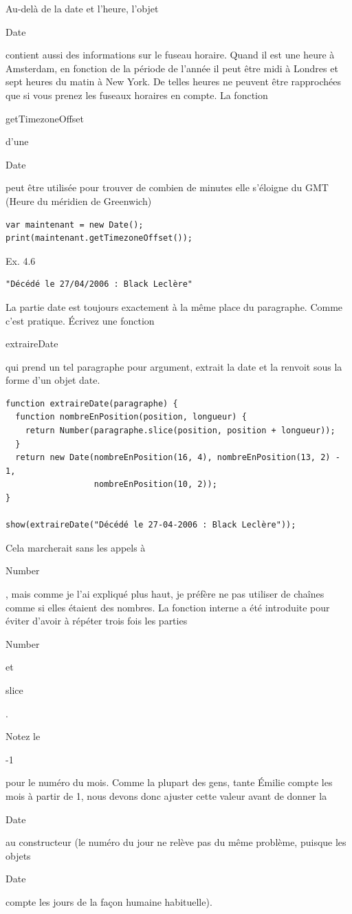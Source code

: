 \documentclass{FramateX}
\renewcommand{\texttt}[1]{\begin{sffamily}{#1}\end{sffamily}}
\begin{document}
\begin{center}\end{center}

Au-delà de la date et l'heure, l'objet \texttt{Date} contient aussi des
informations sur le fuseau horaire. Quand il est une heure à Amsterdam,
en fonction de la période de l'année il peut être midi à Londres et sept
heures du matin à New York. De telles heures ne peuvent être rapprochées
que si vous prenez les fuseaux horaires en compte. La fonction
\texttt{getTimezoneOffset} d'une \texttt{Date} peut être utilisée pour
trouver de combien de minutes elle s'éloigne du GMT (Heure du méridien
de Greenwich)

\begin{lstlisting}
var maintenant = new Date();
print(maintenant.getTimezoneOffset());
\end{lstlisting}
\begin{center}\end{center}

Ex. 4.6

\begin{lstlisting}
"Décédé le 27/04/2006 : Black Leclère"
\end{lstlisting}
La partie date est toujours exactement à la même place du paragraphe.
Comme c'est pratique. Écrivez une fonction \texttt{extraireDate} qui
prend un tel paragraphe pour argument, extrait la date et la renvoit
sous la forme d'un objet date.

\begin{lstlisting}
function extraireDate(paragraphe) {
  function nombreEnPosition(position, longueur) {
    return Number(paragraphe.slice(position, position + longueur));
  }
  return new Date(nombreEnPosition(16, 4), nombreEnPosition(13, 2) - 1,
                  nombreEnPosition(10, 2));
}

show(extraireDate("Décédé le 27-04-2006 : Black Leclère"));
\end{lstlisting}
Cela marcherait sans les appels à \texttt{Number}, mais comme je l'ai
expliqué plus haut, je préfère ne pas utiliser de chaînes comme si elles
étaient des nombres. La fonction interne a été introduite pour éviter
d'avoir à répéter trois fois les parties \texttt{Number} et
\texttt{slice}.

Notez le \texttt{-1} pour le numéro du mois. Comme la plupart des gens,
tante Émilie compte les mois à partir de 1, nous devons donc ajuster
cette valeur avant de donner la \texttt{Date} au constructeur (le numéro
du jour ne relève pas du même problème, puisque les objets \texttt{Date}
compte les jours de la façon humaine habituelle).
\end{document}
